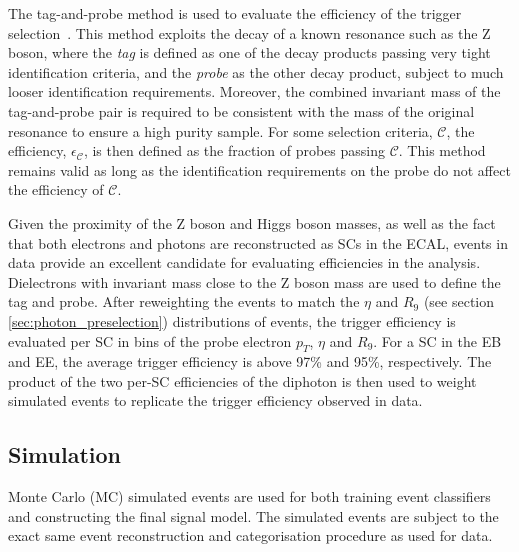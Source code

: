 The tag-and-probe method is used to evaluate the efficiency of the trigger selection~\cite{CMS:2011aa}. This method exploits the decay of a known resonance such as the Z boson, where the \textit{tag} is defined as one of the decay products passing very tight identification criteria, and the \textit{probe} as the other decay product, subject to much looser identification requirements. Moreover, the combined invariant mass of the tag-and-probe pair is required to be consistent with the mass of the original resonance to ensure a high purity sample. For some selection criteria, $\mathcal{C}$, the efficiency, $\epsilon_{\mathcal{C}}$, is then defined as the fraction of probes passing $\mathcal{C}$. This method remains valid as long as the identification requirements on the probe do not affect the efficiency of $\mathcal{C}$.

Given the proximity of the Z boson and Higgs boson masses, as well as the fact that both electrons and photons are reconstructed as SCs in the ECAL, \Zee events in data provide an excellent candidate for evaluating efficiencies in the \Hgg analysis. Dielectrons with invariant mass close to the Z boson mass are used to define the tag and probe. After reweighting the \Zee events to match the $\eta$ and $R_9$ (see section \ref{sec:photon_preselection}) distributions of \Hgg events, the trigger efficiency is evaluated per SC in bins of the probe electron $p_T$, $\eta$ and $R_9$. For a SC in the EB and EE, the average trigger efficiency is above 97\% and 95\%, respectively. The product of the two per-SC efficiencies of the diphoton is then used to weight simulated events to replicate the trigger efficiency observed in data. 

\subsection{Simulation}\label{sec:hgg_simulation}
Monte Carlo (MC) simulated events are used for both training event classifiers and constructing the final signal model. The simulated events are subject to the exact same event reconstruction and categorisation procedure as used for data. 

